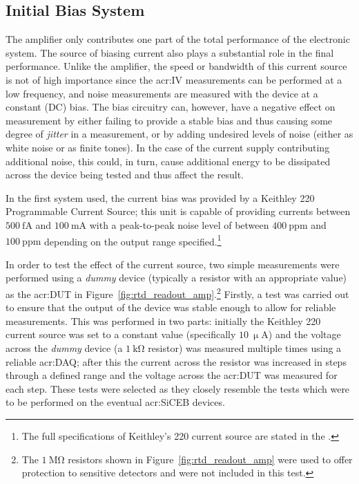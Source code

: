 \subsection{Initial Bias System}
\label{ssec:bias_prelim} 
The amplifier only contributes one part of the total performance of the electronic system. The source of biasing current also plays a substantial role in the final performance. Unlike the amplifier, the speed or bandwidth of this current source is not of high importance since the \gls{acr:IV} measurements can be performed at a low frequency, and noise measurements are measured with the device at a constant (DC) bias. The bias circuitry can, however, have a negative effect on measurement by either failing to provide a stable bias and thus causing some degree of \textit{jitter} in a measurement, or by adding undesired levels of noise (either as white noise or as finite tones). In the case of the current supply contributing additional noise, this could, in turn, cause additional energy to be dissipated across the device being tested and thus affect the result.
\par 
In the first system used, the current bias was provided by a Keithley 220 Programmable Current Source; this unit is capable of providing currents between $500~\mathrm{fA}$ and $100~\mathrm{mA}$ with a peak-to-peak noise level of between $400~\mathrm{ppm}$ and $100~\mathrm{ppm}$ depending on the output range specified.\footnote{The full specifications of Keithley's 220 current source are stated in the \textcite{Keithley220DS}.}
\par 
In order to test the effect of the current source, two simple measurements were performed using a \textit{dummy} device (typically a resistor with an appropriate value) as the \gls{acr:DUT} in Figure~\ref{fig:rtd_readout_amp}.\footnote{The $1~\mathrm{M\Omega}$ resistors shown in Figure~\ref{fig:rtd_readout_amp} were used to offer protection to sensitive detectors and were not included in this test.} Firstly, a test was carried out to ensure that the output of the device was stable enough to allow for reliable measurements. This was performed in two parts: initially the Keithley 220 current source was set to a constant value (specifically $10~\mathrm{\upmu A}$) and the voltage across the \textit{dummy} device (a $1~\mathrm{k\Omega}$ resistor) was measured multiple times using a reliable \gls{acr:DAQ}; after this the current across the resistor was increased in steps through a defined range and the voltage across the \gls{acr:DUT} was measured for each step. These tests were selected as they closely resemble the tests which were to be performed on the eventual \gls{acr:SiCEB} devices.
